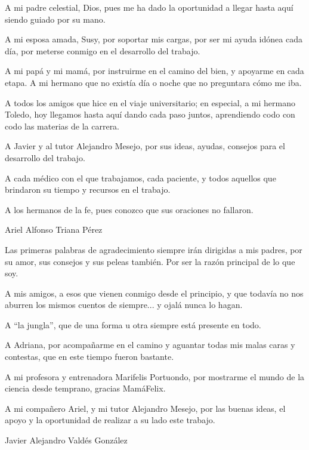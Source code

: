 \begin{acknowledgements}
A mi padre celestial, Dios, pues me ha dado la oportunidad a llegar hasta aquí siendo guiado por su mano.

A mi esposa amada, Susy, por soportar mis cargas, por ser mi ayuda idónea cada día, por meterse conmigo en el desarrollo del trabajo.

A mi papá y mi mamá, por instruirme en el camino del bien, y apoyarme en cada etapa. A mi hermano que no existía día o noche que no preguntara cómo me iba.

A todos los amigos que hice en el viaje universitario; en especial, a mi hermano Toledo, hoy llegamos hasta aquí dando cada paso juntos, aprendiendo codo con codo las materias de la carrera.

A Javier y al tutor Alejandro Mesejo, por sus ideas, ayudas, consejos para el desarrollo del trabajo. 

A cada médico con el que trabajamos, cada paciente, y todos aquellos que brindaron su tiempo y recursos en el trabajo.

A los hermanos de la fe, pues conozco que sus oraciones no fallaron.

\begin{flushright}
	Ariel Alfonso Triana Pérez
\end{flushright}

Las primeras palabras de agradecimiento siempre irán dirigidas a mis padres, por su amor, sus consejos y sus peleas también. Por ser la razón principal de lo que soy.

A mis amigos, a esos que vienen conmigo desde el principio, y que todavía no nos aburren los mismos cuentos de siempre... y ojalá nunca lo hagan.

A ``la jungla'', que de una forma u otra siempre está presente en todo.

A Adriana, por acompañarme en el camino y aguantar todas mis malas caras y contestas, que en este tiempo fueron bastante.

A mi profesora y entrenadora Marifelis Portuondo, por mostrarme el mundo de la ciencia desde temprano, gracias MamáFelix.

A mi compañero Ariel, y mi tutor Alejandro Mesejo, por las buenas ideas, el apoyo y la oportunidad de realizar a su lado este trabajo.

\begin{flushright}
	Javier Alejandro Valdés González
\end{flushright}
\end{acknowledgements}